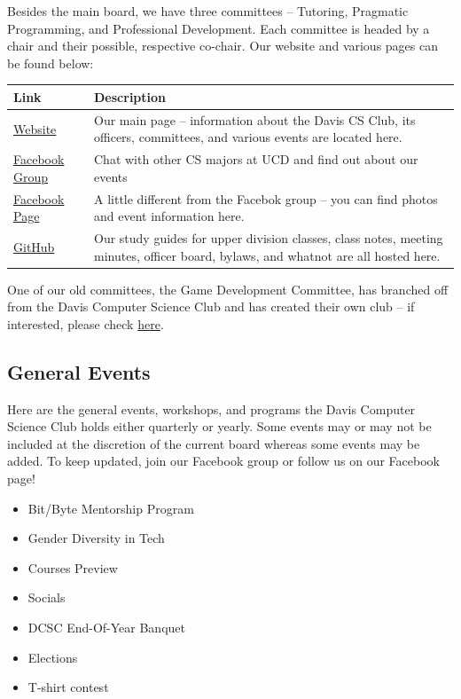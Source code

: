 \documentclass{article}
\begin{document}
Besides the main board, we have three committees -- Tutoring, Pragmatic
Programming, and Professional Development. Each committee is headed by a chair
and their possible, respective co-chair. Our website and various pages can be
found below:
\begin{center}
\begin{tabular}{p{3cm} p{8cm}}
  \toprule
\textbf{Link} & \textbf{Description} \\
  \midrule
\href{http://daviscsclub.org}{Website} & Our main page -- information about the Davis CS Club, its officers, committees, and various events are located here. \\
\href{https://www.facebook.com/groups/daviscsclub/}{Facebook Group} & Chat with other CS majors at UCD and find out about our events \\
\href{https://www.facebook.com/daviscsclub}{Facebook Page} & A little different from the Facebok group -- you can find photos and event information here.\\
\href{https://github.com/DavisCSClub}{GitHub} & Our study guides for upper division classes, class notes, meeting minutes, officer board, bylaws, and whatnot are all hosted here.\\
  \bottomrule
\end{tabular}
\end{center}
One of our old committees, the Game Development Committee, has branched off from
the Davis Computer Science Club and has created their own club -- if interested,
please check \href{https://www.facebook.com/groups/davisgamedev/}{here}.

\subsection {General Events}
Here are the general events, workshops, and programs the Davis Computer Science
Club holds either quarterly or yearly. Some events may or may not be included at
the discretion of the current board whereas some events may be added. To keep
updated, join our Facebook group or follow us on our Facebook page!
\begin{itemize}
    \item Bit/Byte Mentorship Program
    \item Gender Diversity in Tech 
    \item Courses Preview
    \item Socials
    \item DCSC End-Of-Year Banquet
    \item Elections
    \item T-shirt contest
\end{itemize}
\end{document}
